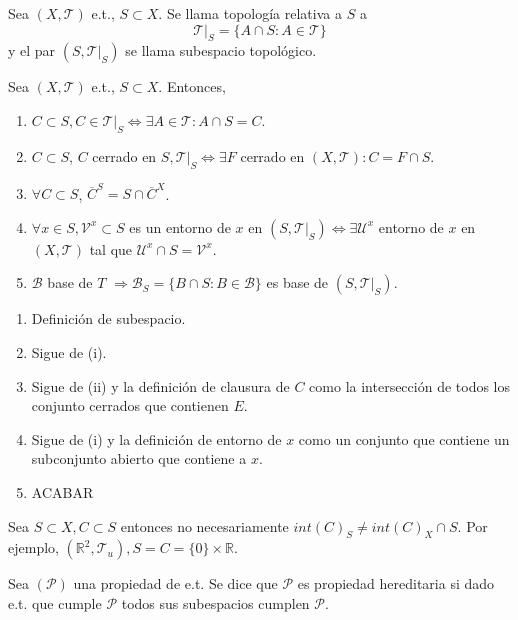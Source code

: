 \begin{defn}[Subespacio]
  Sea $( X, \mathcal{T} )$ e.t., $S \subset X$. Se llama topología relativa a $S$ a 
  \[ 
    \mathcal{T}|_{S} = \{ A \cap S : A \in \mathcal{T} \}  
  \] 
  y el par $( S, \mathcal{T}|_{S} )$ se llama subespacio topológico.
\end{defn}

\begin{prop}
  Sea $( X, \mathcal{T} )$ e.t., $S \subset X$. Entonces,
  \begin{enumerate}[label=(\roman*)]
    \item $C \subset S, C \in \mathcal{T}|_{S} \Leftrightarrow \exists A \in \mathcal{T} : A \cap S = C$.
    \item $C \subset S$, $C$ cerrado en $S, \mathcal{T}|_{S} \Leftrightarrow \exists F$ cerrado en $( X, \mathcal{T} ): C = F \cap S$.
    \item $\forall C \subset S$, $\overline{C}^{S} = S \cap \overline{C}^{X}$.
    \item $\forall x \in S, \mathcal{V}^{x} \subset S$ es un entorno de $x$ en $( S, \mathcal{T}|_{S} ) \Leftrightarrow \exists \mathcal{U}^{x}$ entorno de $x$ en $( X, \mathcal{T} )$ tal que $\mathcal{U}^{x} \cap S = \mathcal{V}^{x}$.
    \item $\mathcal{B}$ base de $T$ $\Rightarrow \mathcal{B}_{S} = \{  B \cap S : B \in \mathcal{B} \}$ es base de $( S, \mathcal{T}|_{S} )$.
  \end{enumerate}
\end{prop}

\begin{dem}
  \begin{enumerate}[label=(\roman*)]
    \item Definición de subespacio.
    \item Sigue de (i).
    \item Sigue de (ii) y la definición de clausura de $C$ como la intersección de todos los conjunto cerrados que contienen $E$.
    \item Sigue de (i) y la definición de entorno de $x$ como un conjunto que contiene un subconjunto abierto que contiene a $x$.
    \item ACABAR
  \end{enumerate}
\end{dem}

\begin{obs}
  Sea $S \subset X, C \subset S$ entonces no necesariamente $int(C)_{S} \neq int(C)_{X} \cap S$. Por ejemplo, $ ( \mathbb{R}^{2}, \mathcal{T}_{u}), S = C = \{ 0 \} \times \mathbb{R}$.
\end{obs}

\begin{defn}
  Sea $(\mathcal{P})$ una propiedad de e.t. Se dice que $\mathcal{P}$ es propiedad hereditaria si dado e.t. que cumple $\mathcal{P}$ todos sus subespacios cumplen $\mathcal{P}$.
\end{defn}

